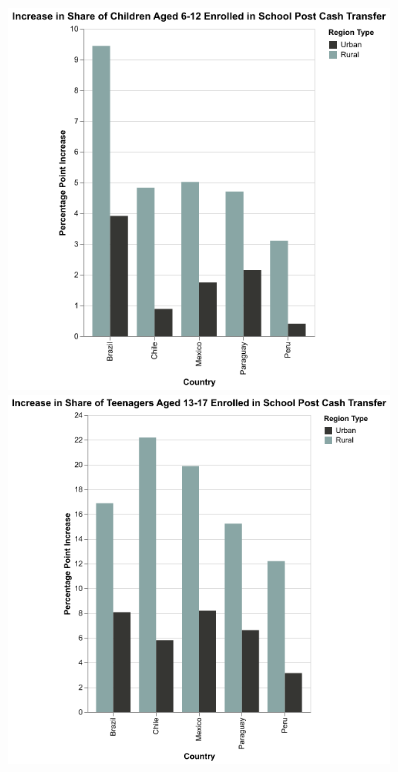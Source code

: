 \documentclass[
  10pt,
]{article}
\begin{document}
\begin{figure}

\begin{minipage}{0.50\linewidth}

\includegraphics[width=0.9\textwidth,height=\textheight]{Graphs/change_enrollment6_12yo.png}

\end{minipage}%
%
\begin{minipage}{0.50\linewidth}

\includegraphics[width=0.9\textwidth,height=\textheight]{Graphs/change_enrollment13_17yo.png}

\end{minipage}%

\end{figure}%
\end{document}
